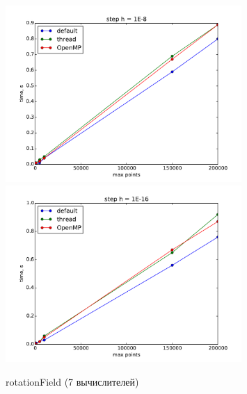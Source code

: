 \documentclass[14pt,final,titlepage,pscyr]{hedwork}
\begin{document}
\begin{figure}[ht!]
    \center
    \includegraphics[width=0.8\textwidth]{rotationField_cl_1E-8}
    \includegraphics[width=0.8\textwidth]{rotationField_cl_1E-16}
    \caption{rotationField (7 вычислителей)}
\end{figure}

\pagebreak
\end{document}
